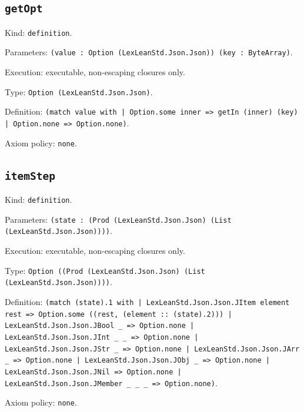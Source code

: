 \documentclass[11pt]{article}
\begin{document}
\subsection*{\texttt{getOpt}}
\noindent Kind: \texttt{definition}.\par
\noindent Parameters: \texttt{(value : Option (LexLeanStd.Json.Json)) (key : ByteArray)}.\par
\noindent Execution: executable, non-escaping closures only.\par
\noindent Type: \texttt{Option (LexLeanStd.Json.Json)}.\par
\noindent Definition: \texttt{(match value with | Option.some inner => getIn (inner) (key) | Option.none => Option.none)}.\par
\noindent Axiom policy: \texttt{none}.\par
\subsection*{\texttt{itemStep}}
\noindent Kind: \texttt{definition}.\par
\noindent Parameters: \texttt{(state : (Prod (LexLeanStd.Json.Json) (List (LexLeanStd.Json.Json))))}.\par
\noindent Execution: executable, non-escaping closures only.\par
\noindent Type: \texttt{Option ((Prod (LexLeanStd.Json.Json) (List (LexLeanStd.Json.Json))))}.\par
\noindent Definition: \texttt{(match (state).1 with | LexLeanStd.Json.Json.JItem element rest => Option.some ((rest, (element :: (state).2))) | LexLeanStd.Json.Json.JBool \_ => Option.none | LexLeanStd.Json.Json.JInt \_ \_ => Option.none | LexLeanStd.Json.Json.JStr \_ => Option.none | LexLeanStd.Json.Json.JArr \_ => Option.none | LexLeanStd.Json.Json.JObj \_ => Option.none | LexLeanStd.Json.Json.JNil => Option.none | LexLeanStd.Json.Json.JMember \_ \_ \_ => Option.none)}.\par
\noindent Axiom policy: \texttt{none}.\par
\end{document}
